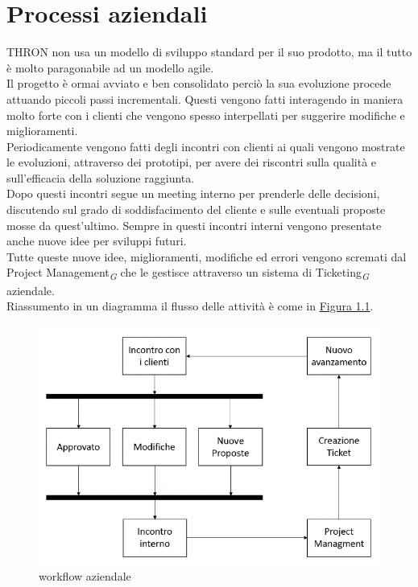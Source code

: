 \documentclass[a4paper, 12pt, twoside, openright]{book}
\newcommand{\gloss}[1]{#1\textsubscript{\textit{\tiny{G}}}}
\begin{document}
\section{Processi aziendali}
THRON non usa un modello di sviluppo standard per il suo prodotto, ma il tutto è molto paragonabile ad un modello agile.\\
Il progetto è ormai avviato e ben consolidato perciò la sua evoluzione procede attuando piccoli passi incrementali. Questi vengono fatti interagendo in maniera molto forte con i clienti che vengono spesso interpellati per suggerire modifiche e miglioramenti.\\
Periodicamente vengono fatti degli incontri con clienti ai quali vengono mostrate le evoluzioni, attraverso dei prototipi, per avere dei riscontri sulla qualità e sull'efficacia della soluzione raggiunta.\\
Dopo questi incontri segue un meeting interno per prenderle delle decisioni, discutendo sul grado di soddisfacimento del cliente e sulle eventuali proposte mosse da quest'ultimo. Sempre in questi incontri interni vengono presentate anche nuove idee per sviluppi futuri.\\
Tutte queste nuove idee, miglioramenti, modifiche ed errori vengono scremati dal \gloss{Project Management} che le gestisce attraverso un \gloss{sistema di Ticketing} aziendale.\\
Riassumento in un diagramma il flusso delle attività è come in \hyperref[thron-workflow]{Figura 1.1}. 
\begin{figure}[H]
	\centering
	\label{thron-workflow}
	\includegraphics[width=1.0\textwidth]{images/thron-workflow.jpg}
	\caption{workflow aziendale}
\end{figure}
\end{document}
